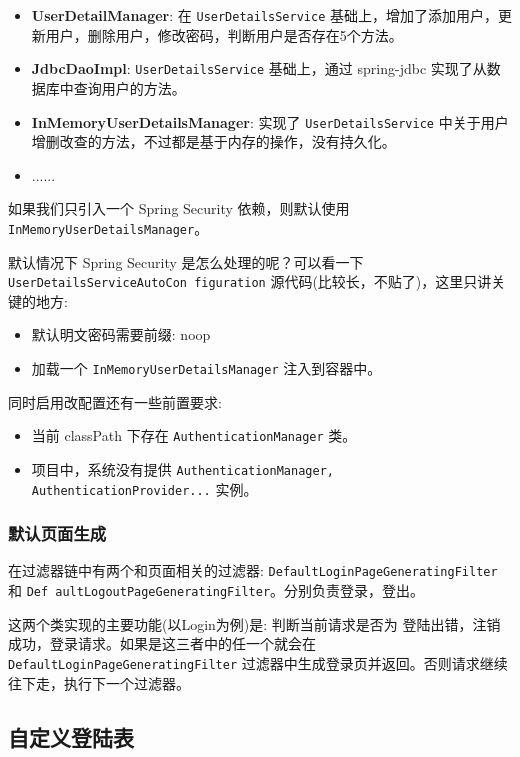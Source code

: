 \begin{itemize}
  \item \textbf{UserDetailManager}: 在 \texttt{UserDetailsService} 基础上，增加了添加用户，更新用户，删除用户，修改密码，判断用户是否存在5个方法。
  \item \textbf{JdbcDaoImpl}: \texttt{UserDetailsService} 基础上，通过 spring-jdbc 实现了从数据库中查询用户的方法。
  \item \textbf{InMemoryUserDetailsManager}: 实现了 \texttt{UserDetailsService} 中关于用户增删改查的方法，不过都是基于内存的操作，没有持久化。
  \item ......
\end{itemize}

如果我们只引入一个 Spring Security 依赖，则默认使用 \texttt{InMemoryUserDetailsManager}。

默认情况下 Spring Security 是怎么处理的呢？可以看一下 \texttt{UserDetailsServiceAutoCon figuration} 源代码(比较长，不贴了)，这里只讲关键的地方:
\begin{itemize}
  \item 默认明文密码需要前缀: {noop}
  \item 加载一个 \texttt{InMemoryUserDetailsManager} 注入到容器中。
\end{itemize}

同时启用改配置还有一些前置要求:
\begin{itemize}
  \item 当前 classPath 下存在 \texttt{AuthenticationManager} 类。
  \item 项目中，系统没有提供 \texttt{AuthenticationManager, AuthenticationProvider...} 实例。
\end{itemize}

\subsubsection*{默认页面生成}

在过滤器链中有两个和页面相关的过滤器: \texttt{DefaultLoginPageGeneratingFilter} 和 \texttt{Def aultLogoutPageGeneratingFilter}。分别负责登录，登出。

这两个类实现的主要功能(以Login为例)是: 判断当前请求是否为 登陆出错，注销成功，登录请求。如果是这三者中的任一个就会在 \texttt{DefaultLoginPageGeneratingFilter} 过滤器中生成登录页并返回。否则请求继续往下走，执行下一个过滤器。

\subsection{自定义登陆表}

